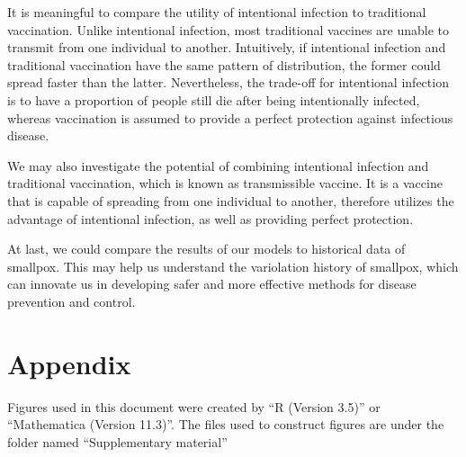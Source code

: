 \documentclass[12pt]{article}
\begin{document}
It is meaningful to compare the utility of intentional infection to traditional vaccination. Unlike intentional infection, most traditional vaccines are unable to transmit from one individual to another. Intuitively, if intentional infection and traditional vaccination have the same pattern of distribution, the former could spread faster than the latter. Nevertheless, the trade-off for intentional infection is to have a proportion of people still die after being intentionally infected, whereas vaccination is assumed to provide a perfect protection against infectious disease.

We may also investigate the potential of combining intentional infection and traditional vaccination, which is known as transmissible vaccine. It is a vaccine that is capable of spreading from one individual to another, therefore utilizes the advantage of intentional infection, as well as providing perfect protection.

At last, we could compare the results of our models to historical data of smallpox. This may help us understand the variolation history of smallpox, which can innovate us in developing safer and more effective methods for disease prevention and control.

\section{Appendix}

Figures used in this document were created by ``R (Version 3.5)'' or ``Mathematica (Version 11.3)''. The files used to construct figures are under the folder named ``Supplementary material''

\printbibliography
\end{document}
